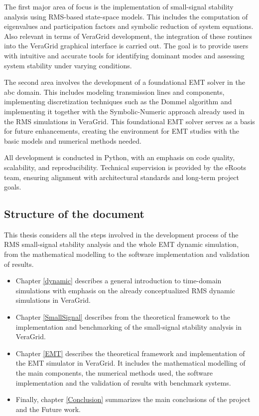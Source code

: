 The first major area of focus is the implementation of small-signal stability analysis using RMS-based state-space models.
This includes the computation of eigenvalues and participation factors and symbolic reduction of system equations.
Also relevant in terms of VeraGrid development, the integration of these routines into the VeraGrid graphical interface is carried out.
The goal is to provide users with intuitive and accurate tools for identifying dominant modes and assessing system stability under varying conditions.

The second area involves the development of a foundational EMT solver in the abc domain. This includes modeling transmission lines and components,
implementing discretization techniques such as the Dommel algorithm and implementing it together with the Symbolic-Numeric approach already used in 
the RMS simulations in VeraGrid. This foundational EMT solver serves as a basis for future enhancements, creating the environment for EMT studies with the basic models 
and numerical methods needed. 

All development is conducted in Python, with an emphasis on code quality, scalability, and reproducibility.
Technical supervision is provided by the eRoots team, ensuring alignment with architectural standards and long-term project goals.

\subsection{Structure of the document}

This thesis considers all the steps involved in the development process of the RMS small-signal stability analysis and the whole EMT
dynamic simulation, from the mathematical modelling to the software implementation and validation of results.

\begin{itemize}
  \item Chapter \ref{dynamic} describes a general introduction to time-domain simulations with emphasis on the already conceptualized RMS dynamic simulations 
  in VeraGrid.
  \item Chapter \ref{SmallSignal} describes from the theoretical framework to the implementation and benchmarking of the small-signal 
stability analysis in VeraGrid.
  \item Chapter \ref{EMT} describes the theoretical framework and implementation of the EMT simulator in VeraGrid. It includes the mathematical modelling
   of the main components, the numerical methods used, the software implementation and the validation of results with benchmark systems.
   \item Finally, chapter \ref{Conclusion} summarizes the main conclusions of the project and the Future work.

  \end{itemize}


